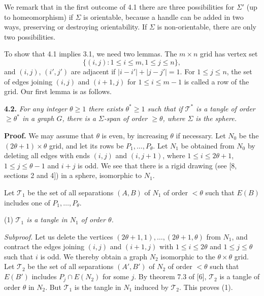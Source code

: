 We remark that in the first outcome of 4.1 there are three possibilities for $\Sigma'$ (up to homeomorphism) if $\Sigma$ is orientable, because a handle can be added in two ways, preserving or destroying orientability. If $\Sigma$ is non-orientable, there are only two possibilities.

To show that 4.1 implies 3.1, we need two lemmas. The $m \times n$ grid has vertex set
\begin{equation*}
\{(i,j) : 1 \le i \le m, 1 \le j \le n\},
\end{equation*}
and $(i,j)$, $(i',j')$ are adjacent if $|i - i'| + |j - j'| = 1$. For $1 \le j \le n$, the set of edges joining $(i,j)$ and $(i + 1, j)$ for $1 \le i \le m - 1$ is called a row of the grid. Our first lemma is as follows.

\textbf{4.2.} \textit{For any integer $\theta \ge 1$ there exists $\theta^* \ge 1$ such that if $\mathscr{T}^*$ is a tangle of order $\ge \theta^*$ in a graph $G$, there is a $\Sigma$-span of order $\ge \theta$, where $\Sigma$ is the sphere.}

\textbf{Proof.} We may assume that $\theta$ is even, by increasing $\theta$ if necessary. Let $N_0$ be the $(2\theta + 1) \times \theta$ grid, and let its rows be $P_1, \dots, P_\theta$. Let $N_1$ be obtained from $N_0$ by deleting all edges with ends $(i,j)$ and $(i,j + 1)$, where $1 \le i \le 2\theta + 1$, $1 \le j \le \theta - 1$ and $i + j$ is odd. We see that there is a rigid drawing (see [8, sections 2 and 4]) in a sphere, isomorphic to $N_1$.

Let $\mathscr{T}_1$ be the set of all separations $(A, B)$ of $N_1$ of order $< \theta$ such that $E(B)$ includes one of $P_1, \dots, P_\theta$.

\hspace*{12pt}(1) \textit{$\mathscr{T}_1$ is a tangle in $N_1$ of order $\theta$.}

\textit{Subproof.} Let us delete the vertices $(2\theta + 1, 1), \dots, (2\theta + 1, \theta)$ from $N_1$, and contract the edges joining $(i,j)$ and $(i + 1, j)$ with $1 \le i \le 2\theta$ and $1 \le j \le \theta$ such that $i$ is odd. We thereby obtain a graph $N_2$ isomorphic to the $\theta \times \theta$ grid. Let $\mathscr{T}_2$ be the set of all separations $(A', B')$ of $N_2$ of order $< \theta$ such that $E(B')$ includes $P_j \cap E(N_2)$ for some $j$. By theorem 7.3 of [6], $\mathscr{T}_2$ is a tangle of order $\theta$ in $N_2$. But $\mathscr{T}_1$ is the tangle in $N_1$ induced by $\mathscr{T}_2$. This proves (1).

